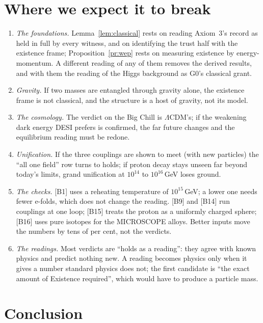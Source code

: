 \documentclass[11pt,a4paper]{article}
\theoremstyle{definition}
\newcommand{\chk}[1]{\textsf{[#1]}}
\begin{document}
\section{Where we expect it to break}\label{sec:break}
\begin{enumerate}[nosep]
\item \emph{The foundations.} Lemma~\ref{lem:classical} rests on reading Axiom~3's record as held in full by every witness, and on
identifying the trust half with the existence frame; Proposition~\ref{pr:wep} rests on measuring existence by energy-momentum. A different
reading of any of them removes the derived results, and with them the reading of the Higgs background as G0's classical grant.
\item \emph{Gravity.} If two masses are entangled through gravity alone, the existence frame is not classical, and the structure is a host
of gravity, not its model.
\item \emph{The cosmology.} The verdict on the Big Chill is $\Lambda$CDM's; if the weakening dark energy DESI prefers is confirmed, the far
future changes and the equilibrium reading must be redone.
\item \emph{Unification.} If the three couplings are shown to meet (with new particles) the ``all one field'' row turns to holds; if proton
decay stays unseen far beyond today's limits, grand unification at $10^{14}$ to $10^{16}$\,GeV loses ground.
\item \emph{The checks.} \chk{B1} uses a reheating temperature of $10^{15}$\,GeV; a lower one needs fewer e-folds, which does not change
the reading. \chk{B9} and \chk{B14} run couplings at one loop; \chk{B15} treats the proton as a uniformly charged sphere; \chk{B16} uses
pure isotopes for the MICROSCOPE alloys. Better inputs move the numbers by tens of per cent, not the verdicts.
\item \emph{The readings.} Most verdicts are ``holds as a reading'': they agree with known physics and predict nothing new. A reading
becomes physics only when it gives a number standard physics does not; the first candidate is ``the exact amount of Existence required'',
which would have to produce a particle mass.
\end{enumerate}

\section{Conclusion}
\end{document}
